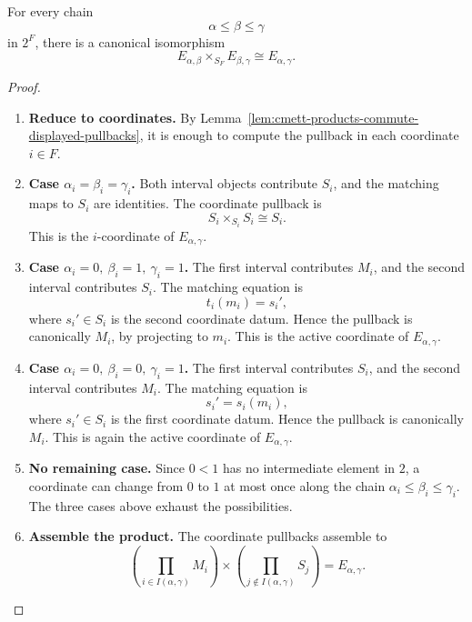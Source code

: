 \begin{lemma}
\label{lem:cmett-interval-pullback-calculation}
    For every chain
    \[
        \alpha\leq\beta\leq\gamma
    \]
    in \(2^F\), there is a canonical isomorphism
    \[
        E_{\alpha,\beta}
        \times_{S_F}
        E_{\beta,\gamma}
        \cong
        E_{\alpha,\gamma}.
    \]
\end{lemma}

\begin{proof}
    \leavevmode
    \begin{enumerate}
        \item \textbf{Reduce to coordinates.}
        By Lemma~\ref{lem:cmett-products-commute-displayed-pullbacks}, it is
        enough to compute the pullback in each coordinate \(i\in F\).

        \item \textbf{Case \(\alpha_i=\beta_i=\gamma_i\).}
        Both interval objects contribute \(S_i\), and the matching maps to
        \(S_i\) are identities. The coordinate pullback is
        \[
            S_i\times_{S_i}S_i\cong S_i.
        \]
        This is the \(i\)-coordinate of \(E_{\alpha,\gamma}\).

        \item \textbf{Case \(\alpha_i=0,\ \beta_i=1,\ \gamma_i=1\).}
        The first interval contributes \(M_i\), and the second interval
        contributes \(S_i\). The matching equation is
        \[
            t_i(m_i)=s_i',
        \]
        where \(s_i'\in S_i\) is the second coordinate datum. Hence the
        pullback is canonically \(M_i\), by projecting to \(m_i\). This is
        the active coordinate of \(E_{\alpha,\gamma}\).

        \item \textbf{Case \(\alpha_i=0,\ \beta_i=0,\ \gamma_i=1\).}
        The first interval contributes \(S_i\), and the second interval
        contributes \(M_i\). The matching equation is
        \[
            s_i'=s_i(m_i),
        \]
        where \(s_i'\in S_i\) is the first coordinate datum. Hence the
        pullback is canonically \(M_i\). This is again the active coordinate
        of \(E_{\alpha,\gamma}\).

        \item \textbf{No remaining case.}
        Since \(0<1\) has no intermediate element in \(2\), a coordinate can
        change from \(0\) to \(1\) at most once along the chain
        \(\alpha_i\leq\beta_i\leq\gamma_i\). The three cases above exhaust
        the possibilities.

        \item \textbf{Assemble the product.}
        The coordinate pullbacks assemble to
        \[
            \left(\prod_{i\in I(\alpha,\gamma)}M_i\right)
            \times
            \left(\prod_{j\notin I(\alpha,\gamma)}S_j\right)
            =
            E_{\alpha,\gamma}.
        \]
    \end{enumerate}
\end{proof}

